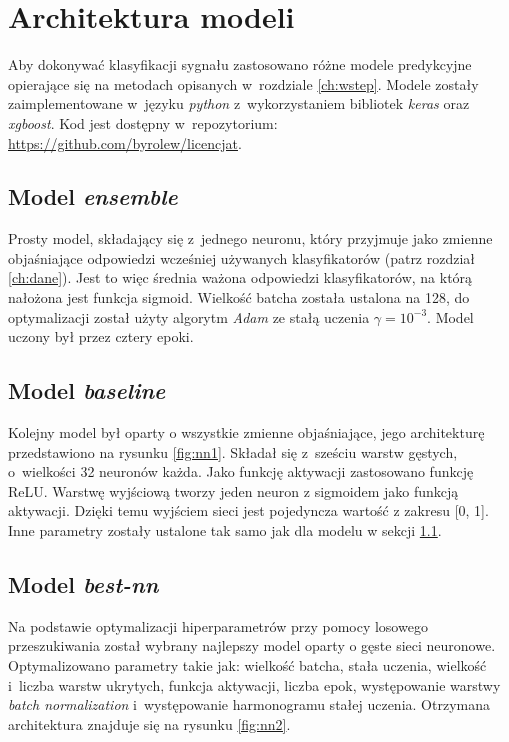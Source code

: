\documentclass{pracalicmgr}
\begin{document}
		
    \chapter{Architektura modeli}
	Aby dokonywać klasyfikacji sygnału zastosowano różne modele predykcyjne opierające się na metodach opisanych w~rozdziale \ref{ch:wstep}. Modele zostały zaimplementowane w~języku \textit{python} z~wykorzystaniem bibliotek \textit{keras} oraz \textit{xgboost}. Kod jest dostępny w~repozytorium: \url{https://github.com/byrolew/licencjat}.
	\section{Model \textit{ensemble}}
	\label{sec:mod1}
	Prosty model, składający się z~jednego neuronu, który przyjmuje jako zmienne objaśniające odpowiedzi wcześniej używanych klasyfikatorów (patrz rozdział \ref{ch:dane}). Jest to więc średnia ważona odpowiedzi klasyfikatorów, na którą nałożona jest funkcja sigmoid. Wielkość batcha została ustalona na 128, do optymalizacji został użyty algorytm \textit{Adam} ze stałą uczenia $\gamma = 10^{-3}$. Model uczony był przez cztery epoki. 
	
	\section{Model \textit{baseline}}
	\label{sec:mod2}
	Kolejny model był oparty o wszystkie zmienne objaśniające, jego architekturę przedstawiono na rysunku \ref{fig:nn1}. Składał się z~sześciu warstw gęstych, o~wielkości 32 neuronów każda. Jako funkcję aktywacji zastosowano funkcję ReLU. Warstwę wyjściową tworzy jeden neuron z sigmoidem jako funkcją aktywacji. Dzięki temu wyjściem sieci jest pojedyncza wartość z zakresu [0, 1]. Inne parametry zostały ustalone tak samo jak dla modelu w sekcji \ref{sec:mod1}.
	
	\section{Model \textit{best-nn}}
	Na podstawie optymalizacji hiperparametrów przy pomocy losowego przeszukiwania został wybrany najlepszy model oparty o gęste sieci neuronowe. Optymalizowano parametry takie jak: wielkość batcha, stała uczenia, wielkość i~liczba warstw ukrytych, funkcja aktywacji, liczba epok, występowanie warstwy \textit{batch normalization} i~występowanie harmonogramu stałej uczenia. Otrzymana architektura znajduje się na rysunku \ref{fig:nn2}. 
	
\end{document}
